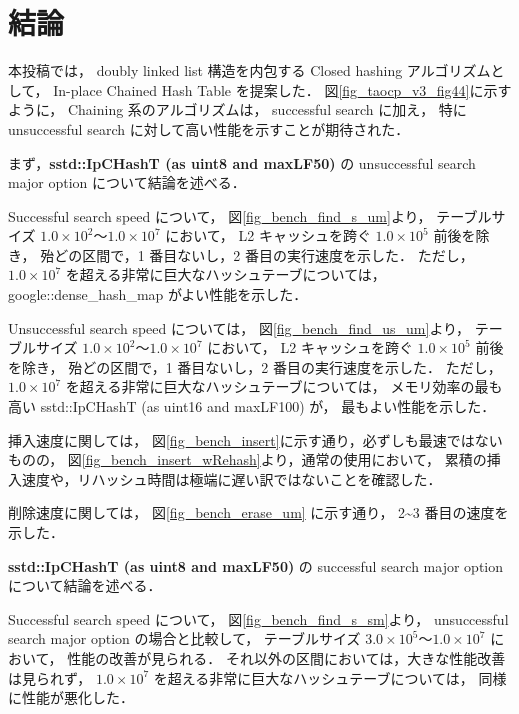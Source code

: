 \chapter{結論}
\label{chap_Conclusion}


本投稿では，
doubly linked list 構造を内包する Closed hashing アルゴリズムとして，
In-place Chained Hash Table を提案した．
図\ref{fig_taocp_v3_fig44}に示すように，
Chaining 系のアルゴリズムは， successful search に加え，
特に unsuccessful search に対して高い性能を示すことが期待された．
\newline

まず，{\bf sstd::IpCHashT (as uint8 and maxLF50)} の unsuccessful search major option について結論を述べる．

Successful search speed について，
図\ref{fig_bench_find_s_um}より，
テーブルサイズ $1.0\times10^2〜1.0\times10^7$ において，
L2 キャッシュを跨ぐ $1.0\times10^5$ 前後を除き，
殆どの区間で，1 番目ないし，2 番目の実行速度を示した．
ただし，$1.0\times10^7$ を超える非常に巨大なハッシュテーブについては，
google::dense\_hash\_map がよい性能を示した．

Unsuccessful search speed については，
図\ref{fig_bench_find_us_um}より，
テーブルサイズ $1.0\times10^2〜1.0\times10^7$ において，
L2 キャッシュを跨ぐ $1.0\times10^5$ 前後を除き，
殆どの区間で，1 番目ないし，2 番目の実行速度を示した．
ただし，$1.0\times10^7$ を超える非常に巨大なハッシュテーブについては，
メモリ効率の最も高い sstd::IpCHashT (as uint16 and maxLF100) が，
最もよい性能を示した．

挿入速度に関しては，
図\ref{fig_bench_insert}に示す通り，必ずしも最速ではないものの，
図\ref{fig_bench_insert_wRehash}より，通常の使用において，
累積の挿入速度や，リハッシュ時間は極端に遅い訳ではないことを確認した．

削除速度に関しては，
図\ref{fig_bench_erase_um} に示す通り，
2\textasciitilde 3 番目の速度を示した．
\newline

{\bf sstd::IpCHashT (as uint8 and maxLF50)} の successful search major option について結論を述べる．

Successful search speed について，
図\ref{fig_bench_find_s_sm}より，
unsuccessful search major option の場合と比較して，
テーブルサイズ $3.0\times10^5〜1.0\times10^7$ において，
性能の改善が見られる．
それ以外の区間においては，大きな性能改善は見られず，
$1.0\times10^7$ を超える非常に巨大なハッシュテーブについては，
同様に性能が悪化した．

